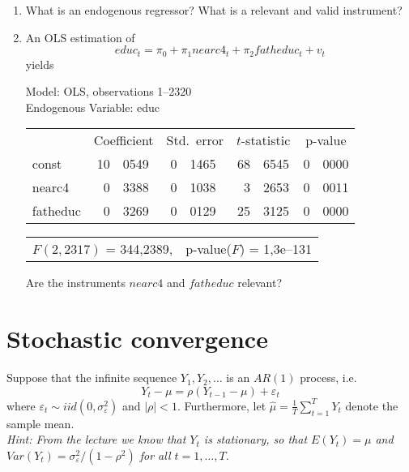 \documentclass{article}
\begin{document}
\begin{enumerate}[label=(\alph*)]
	\item What is an endogenous regressor? What is a relevant and valid instrument?
	
	\item An  OLS estimation of 
	$$ educ_t = \pi_0 + \pi_1 nearc4_t + \pi_2 fatheduc_t + v_t$$ yields
	\renewcommand{\arraystretch}{0.8}
	\begin{center}		
		Model: OLS, observations 1--2320\\
		Endogenous Variable: educ\\
		
		\vspace{1em}
		
		\begin{tabular}{lr@{,}lr@{,}lr@{,}lr@{,}l}
			&
			\multicolumn{2}{c}{Coefficient} &
			\multicolumn{2}{c}{Std.\ error} &
			\multicolumn{2}{c}{$t$-statistic} &
			\multicolumn{2}{c}{p-value} \\[1ex]
			const &
			10&0549 &
			0&1465 &
			68&6545 &
			0&0000 \\
			nearc4 &
			0&3388 &
			0&1038 &
			3&2653 &
			0&0011 \\
			fatheduc &
			0&3269 &
			0&0129 &
			25&3125 &
			0&0000 \\
		\end{tabular}
		
		\vspace{1ex}
		\begin{tabular}{lr}
		$F(2, 2317)$ = 344,2389, & p-value($F$) = 1,3\textrm{e--131}
		\end{tabular}
		
		\vspace{1em}
		
	\end{center}
	Are the instruments $nearc4$ and $fatheduc$ relevant? 
	\renewcommand{\arraystretch}{1.5}
	
	
\end{enumerate}

\newpage
\section{Stochastic convergence}
Suppose that the infinite sequence $Y_{1},Y_{2},\ldots $ is an $AR(1)$ process, i.e.
$$Y_{t}-\mu =\rho \left(Y_{t-1}-\mu\right) +\varepsilon _{t}$$ where $\varepsilon _{t}\sim iid(0,\sigma_{\varepsilon }^{2})$ and $|\rho |<1$. Furthermore, let $\hat{\mu} =\frac{1}{T}\sum_{t=1}^{T}Y_{t}$ denote the sample mean.\\
\textit{Hint: From the lecture we know that $Y_t$ is stationary, so that $E(Y_t) = \mu$ and $Var(Y_t) = \sigma_\varepsilon^2/(1-\rho^2)$ for all $t=1,...,T$.}
\end{document}
